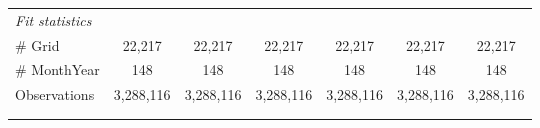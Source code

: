 \begin{table}[htbp]
\begin{tabular}{lcccccc}
      \midrule
      \emph{Fit statistics}\\
      \# Grid                                                             & 22,217        & 22,217        & 22,217        & 22,217        & 22,217        & 22,217\\  
      \# MonthYear                                                        & 148           & 148           & 148           & 148           & 148           & 148\\  
      Observations                                                        & 3,288,116     & 3,288,116     & 3,288,116     & 3,288,116     & 3,288,116     & 3,288,116\\  
      \midrule \midrule
                                                                          &               &               &               &               &               &  \tabularnewline 
      \\
   \end{tabular}
\end{table}


